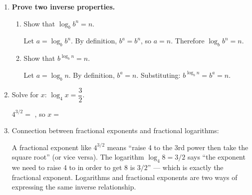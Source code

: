 \documentclass[10pt]{article}
\begin{document}
\vspace{0.08in}

\begin{tcolorbox}[colback=white, colframe=black!40,
    title=\textbf{Tier E --- Extend},
    fonttitle=\bfseries, arc=2mm, left=3mm, right=3mm, top=2mm, bottom=2mm]

\begin{enumerate}[itemsep=10pt]

  \item \textbf{Prove two inverse properties.}

        \begin{enumerate}[label=(\alph*), itemsep=8pt]
          \item Show that $\log_b b^n = n$.

                \begin{teachernote}
                Let $a = \log_b b^n$. By definition, $b^a = b^n$, so $a = n$.
                Therefore $\log_b b^n = n$.
                \end{teachernote}

          \item Show that $b^{\log_b n} = n$.

                \begin{teachernote}
                Let $a = \log_b n$. By definition, $b^a = n$.
                Substituting: $b^{\log_b n} = b^a = n$.
                \end{teachernote}
        \end{enumerate}

  \item Solve for $x$: $\log_4 x = \dfrac{3}{2}$.

        $4^{3/2} = $ , so $x = $ 

  \item Connection between fractional exponents and fractional logarithms:

        \begin{teachernote}
        A fractional exponent like $4^{3/2}$ means ``raise 4 to the 3rd power then take the
        square root'' (or vice versa). The logarithm $\log_4 8 = 3/2$ says ``the exponent we
        need to raise 4 to in order to get 8 is $3/2$'' --- which is exactly the fractional
        exponent. Logarithms and fractional exponents are two ways of expressing the same
        inverse relationship.
        \end{teachernote}

\end{enumerate}
\end{tcolorbox}
\end{document}
